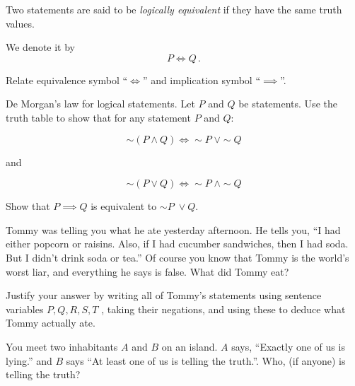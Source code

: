 \documentclass[12pt]{amsart}
\begin{document}
\begin{definition}
	Two statements are said to be \emph{logically equivalent} if
	they have the same truth values.

	We denote it by
	\begin{equation*}
		P \iff Q \,.
	\end{equation*}
\end{definition}

\begin{problem}
Relate equivalence symbol ``$\iff$'' and implication symbol ``$\implies$''.
\end{problem}
\vspace{5cm}






\begin{problem}
De Morgan's law for logical statements.
Let $P$ and $Q$ be statements.
Use the truth table to show that for any statement $P$ and $Q$:

\begin{equation*}
	\sim (P \wedge Q ) \iff \sim P \; \vee \sim Q
\end{equation*}

and

\begin{equation*}
	\sim (P \vee Q) \iff \sim P \; \wedge \sim Q
\end{equation*}
\end{problem}

\vspace{5cm}

\begin{problem}
Show that $P \implies Q$ is equivalent to
$\sim P \; \vee Q$.
\end{problem}

\vspace{5cm}


\begin{problem}
Tommy was telling you what he ate yesterday afternoon. He tells you, “I had either popcorn or raisins. Also, if I had cucumber sandwiches, then I had soda. But I didn't drink soda or tea.” Of course you know that Tommy is the world's worst liar, and everything he says is false. What did Tommy eat?

Justify your answer by writing all of Tommy's statements using sentence variables $ P,Q,R,S,T$
, taking their negations, and using these to deduce what Tommy actually ate.
\end{problem}

\newpage

\begin{problem}
You meet two inhabitants $A$ and $B$ on an island.
$A$ says, “Exactly one of us is lying.”
and $B$ says “At least one of us is telling the truth.”.
Who, (if anyone) is telling the truth?
\end{problem}
\end{document}
